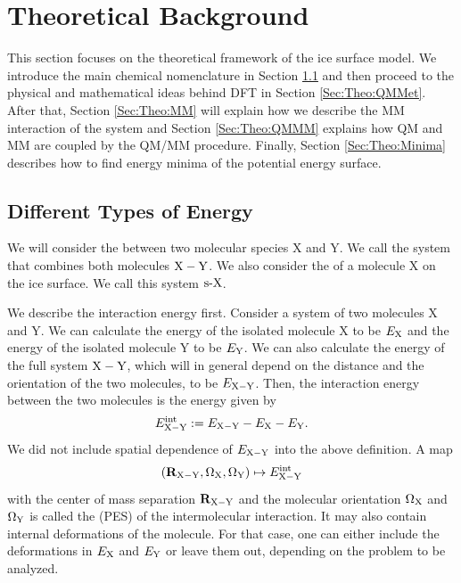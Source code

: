 \section{Theoretical Background}
\label{Sec:Theo}
This section focuses on the theoretical framework of the ice surface model. We introduce the main chemical
nomenclature in Section \ref{Sec:Theo:Interaction} and then proceed to the
physical and mathematical ideas behind DFT in Section \ref{Sec:Theo:QMMet}.
After that, Section \ref{Sec:Theo:MM} will explain how we describe the MM
interaction of the system and Section \ref{Sec:Theo:QMMM} explains how QM and
MM are coupled by the QM/MM procedure. Finally, Section \ref{Sec:Theo:Minima}
describes how to find energy minima of the potential energy surface.

\newcommand\X{\enmat{\te X}}
\newcommand\Y{\enmat{\te Y}}
\newcommand\Z{\enmat{\te Z}}
\newcommand\XY{{\enmat{{\X - \Y}}}}
\renewcommand\S{\enmat{\te S}}
\newcommand\sX{\enmat{{\sur\te{X}}}}
\newcommand\A{\enmat{\te A}}
\subsection{Different Types of Energy}
\label{Sec:Theo:Interaction}
We will consider the  between two molecular species X and Y. We call
the system that combines both molecules $\XY$. We also consider the
 of a molecule X on the ice surface. We call this system $\sX$.

We describe the interaction energy first.
Consider a system of two molecules X and Y. We can calculate the energy of the isolated molecule X to
be $E_{\text X}$ and the energy of the isolated molecule Y to be $E_{\text Y}$. We can also calculate the 
energy of the full system $\XY$, which will in general depend on the distance and the orientation
of the two molecules, to be $E_{\XY}$. Then, the interaction energy between the two molecules
is the energy given by
\begin{equation}
 \eint_{\XY} := E_{\XY} - E_\X - E_\Y.
 \label{Theo:InteractionEnergy}
\end{equation}
We did not include spatial dependence of $E_{\XY}$ into the above definition. A
map 
\begin{equation}
(\bo R_\XY, \Om_\X, \Om_\Y) \mapsto \eint_\XY
\label{Theo:PES}
\end{equation}
with the center 
of mass separation $\bo R_\XY$ and the molecular orientation $\Om_\X$ and $\Om_\Y$
is called the  (PES) of the intermolecular interaction. It may also contain internal deformations of
the molecule. For that case, one can either include the deformations in $E_\X$
and $E_\Y$ or leave them out, depending on the problem to be analyzed.

